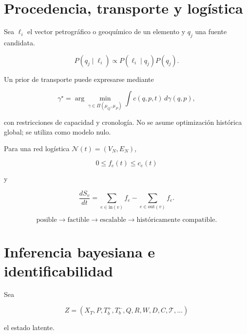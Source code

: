 
\section{Procedencia, transporte y logística}

Sea \(\bm\ell_i\) el vector petrográfico o geoquímico de un elemento y \(q_j\) una fuente candidata.

\begin{equation}
\boxed{
P(q_j\mid\bm\ell_i)
\propto
P(\bm\ell_i\mid q_j)P(q_j).
}
\end{equation}

Un prior de transporte puede expresarse mediante

\begin{equation}
\gamma^\star
=
\arg\min_{\gamma\in\Pi(\mu_Q,\mu_P)}
\int c(q,p,t)\,d\gamma(q,p),
\end{equation}

con restricciones de capacidad y cronología. No se asume optimización histórica global; se utiliza como modelo nulo.

Para una red logística \(\mathcal N(t)=(V_N,E_N)\),

\begin{equation}
0\le f_e(t)\le c_e(t)
\end{equation}

y

\begin{equation}
\frac{dS_v}{dt}
=
\sum_{e\in\mathrm{in}(v)}f_e
-
\sum_{e\in\mathrm{out}(v)}f_e.
\end{equation}

\begin{principle}
\begin{equation}
\boxed{
\text{posible}
\rightarrow
\text{factible}
\rightarrow
\text{escalable}
\rightarrow
\text{históricamente compatible}.
}
\end{equation}
\end{principle}

\section{Inferencia bayesiana e identificabilidad}

Sea

\begin{equation}
Z=
(X_T,P,T_b^+,T_b^-,Q,R,W,D,C,\mathcal T,\ldots)
\end{equation}

el estado latente.

